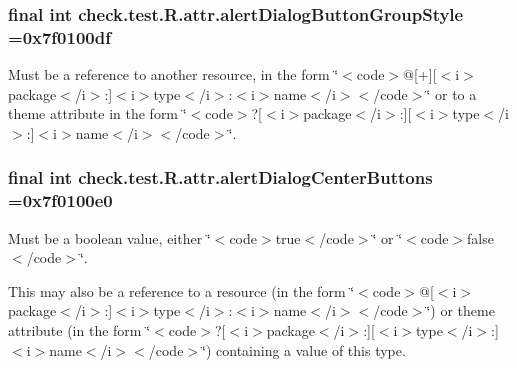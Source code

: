 \subsubsection[{alert\+Dialog\+Button\+Group\+Style}]{\setlength{\rightskip}{0pt plus 5cm}final int check.\+test.\+R.\+attr.\+alert\+Dialog\+Button\+Group\+Style =0x7f0100df\hspace{0.3cm}{\ttfamily [static]}}\label{classcheck_1_1test_1_1_r_1_1attr_abc36e528bd90cfdb9882099faa4fe301}
Must be a reference to another resource, in the form \char`\"{}$<$code$>$@\mbox{[}+\mbox{]}\mbox{[}$<$i$>$package$<$/i$>$\+:\mbox{]}$<$i$>$type$<$/i$>$\+:$<$i$>$name$<$/i$>$$<$/code$>$\char`\"{} or to a theme attribute in the form \char`\"{}$<$code$>$?\mbox{[}$<$i$>$package$<$/i$>$\+:\mbox{]}\mbox{[}$<$i$>$type$<$/i$>$\+:\mbox{]}$<$i$>$name$<$/i$>$$<$/code$>$\char`\"{}. \hypertarget{classcheck_1_1test_1_1_r_1_1attr_a6bc9e9d1de7ab7695441b316c871825c}{}
\subsubsection[{alert\+Dialog\+Center\+Buttons}]{\setlength{\rightskip}{0pt plus 5cm}final int check.\+test.\+R.\+attr.\+alert\+Dialog\+Center\+Buttons =0x7f0100e0\hspace{0.3cm}{\ttfamily [static]}}\label{classcheck_1_1test_1_1_r_1_1attr_a6bc9e9d1de7ab7695441b316c871825c}
Must be a boolean value, either \char`\"{}$<$code$>$true$<$/code$>$\char`\"{} or \char`\"{}$<$code$>$false$<$/code$>$\char`\"{}. 

This may also be a reference to a resource (in the form \char`\"{}$<$code$>$@\mbox{[}$<$i$>$package$<$/i$>$\+:\mbox{]}$<$i$>$type$<$/i$>$\+:$<$i$>$name$<$/i$>$$<$/code$>$\char`\"{}) or theme attribute (in the form \char`\"{}$<$code$>$?\mbox{[}$<$i$>$package$<$/i$>$\+:\mbox{]}\mbox{[}$<$i$>$type$<$/i$>$\+:\mbox{]}$<$i$>$name$<$/i$>$$<$/code$>$\char`\"{}) containing a value of this type. \hypertarget{classcheck_1_1test_1_1_r_1_1attr_a266f3305ed6d39e276ec791931594f34}{}
